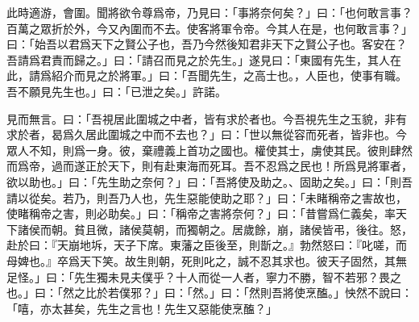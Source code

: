 此時適游，會圍。聞將欲令尊爲帝，乃見曰：「事將奈何矣？」曰：「也何敢言事？百萬之眾折於外，今又內圍而不去。使客將軍令帝。今其人在是，也何敢言事？」曰：「始吾以君爲天下之賢公子也，吾乃今然後知君非天下之賢公子也。客安在？吾請爲君責而歸之。」曰：「請召而見之於先生。」遂見曰：「東國有先生，其人在此，請爲紹介而見之於將軍。」曰：「吾聞先生，之高士也。，人臣也，使事有職。吾不願見先生也。」曰：「已泄之矣。」許諾。

見而無言。曰：「吾視居此圍城之中者，皆有求於者也。今吾視先生之玉貌，非有求於者，曷爲久居此圍城之中而不去也？」曰：「世以無從容而死者，皆非也。今眾人不知，則爲一身。彼，棄禮義上首功之國也。權使其士，虜使其民。彼則肆然而爲帝，過而遂正於天下，則有赴東海而死耳。吾不忍爲之民也！所爲見將軍者，欲以助也。」曰：「先生助之奈何？」曰：「吾將使及助之。、固助之矣。」曰：「則吾請以從矣。若乃，則吾乃人也，先生惡能使助之耶？」曰：「未睹稱帝之害故也，使睹稱帝之害，則必助矣。」曰：「稱帝之害將奈何？」曰：「昔嘗爲仁義矣，率天下諸侯而朝。貧且微，諸侯莫朝，而獨朝之。居歲餘，崩，諸侯皆弔，後往。怒，赴於曰：『天崩地坼，天子下席。東藩之臣後至，則斮之。』勃然怒曰：『叱嗟，而母婢也。』卒爲天下笑。故生則朝，死則叱之，誠不忍其求也。彼天子固然，其無足怪。」曰：「先生獨未見夫僕乎？十人而從一人者，寧力不勝，智不若邪？畏之也。」曰：「然之比於若僕邪？」曰：「然。」曰：「然則吾將使烹醢。」怏然不說曰：「嘻，亦太甚矣，先生之言也！先生又惡能使烹醢？」

